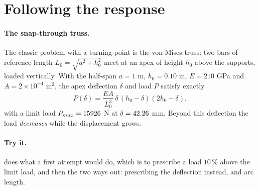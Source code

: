 \section{Following the response}\label{sec:nl-paths}

\paragraph{The snap-through truss.}
The classic problem with a turning point is the von Mises truss: two bars of reference length $L_0=\sqrt{a^2+h_0^2}$ meet at an apex of height $h_0$ above the supports, loaded vertically. With the half-span $a=1$ m, $h_0=0.10$ m, $E=210$ GPa and $A=2\times10^{-4}$ m$^2$, the apex deflection $\delta$ and load $P$ satisfy exactly
\begin{equation}\label{eq:nl-vm}
P(\delta)=\frac{EA}{L_0^{3}}\,\delta\,(h_0-\delta)(2h_0-\delta),
\end{equation}
with a limit load $P_{max}=15926$ N at $\delta=42.26$ mm. Beyond this deflection the load \emph{decreases} while the displacement grows.

\paragraph{Try it.}  does what a first attempt would do, which is to prescribe a load $10\,\%$ above the limit load, and then the two ways out: prescribing the deflection instead, and arc length.

